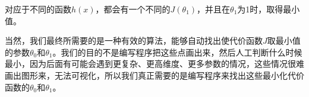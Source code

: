 \documentclass{article}
\begin{document}
\begin{large}
  对应于不同的函数$h(x)$，都会有一个不同的$J(\theta_1)$，并且在$\theta_1$为1时，取得最小值。

  当然，我们最终所需要的是一种有效的算法，能够自动找出使代价函数$J$取最小值的参数$\theta_0$和$\theta_1$。我们的目的不是编写程序把这些点画出来，然后人工判断什么时候最小，因为后面有可能会遇到更复杂、更高维度、更多参数的情况，这些情况很难画出图形来，无法可视化，所以我们真正需要的是编写程序来找出这些最小化代价函数的$\theta_0$和$\theta_1$。
\end{large}
\end{document}
